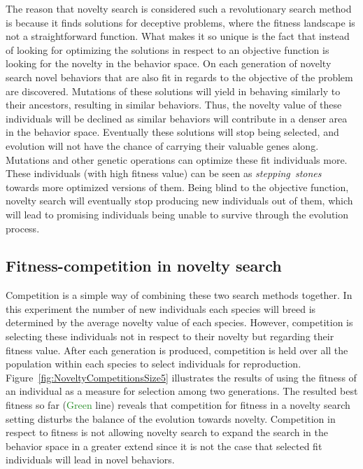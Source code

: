 The reason that novelty search is considered such a revolutionary search method is because it finds solutions for deceptive problems, where the fitness landscape is not a straightforward function. What makes it so unique is the fact that instead of looking for optimizing the solutions in respect to an objective function is looking for the novelty in the behavior space. On each generation of novelty search novel behaviors that are also fit in regards to the objective of the problem are discovered. Mutations of these solutions will yield in behaving similarly to their ancestors, resulting in similar behaviors. Thus, the novelty value of these individuals will be declined as similar behaviors will contribute in a denser area in the behavior space. Eventually these solutions will stop being selected, and evolution will not have the chance of carrying their valuable genes along. Mutations and other genetic operations can optimize these fit individuals more. These individuals (with high fitness value) can be seen as \emph{stepping~stones}~\citep{lehman2011abandoning} towards more optimized versions of them. Being blind to the objective function, novelty search will eventually stop producing new individuals out of them, which will lead to promising individuals being unable to survive through the evolution process.

\subsection*{Fitness-competition in novelty search}


Competition is a simple way of combining these two search methods together. In this experiment the number of new individuals each species will breed is determined by the average novelty value of each species. However, competition is selecting these individuals not in respect to their novelty but regarding their fitness value. After each generation is produced, competition is held over all the population within each species to select individuals for reproduction. Figure~\ref{fig:NoveltyCompetitionsSize5} illustrates the results of using the fitness of an individual as a measure for selection among two generations. The resulted best fitness so far (\textcolor{ForestGreen}{Green} line) reveals that competition for fitness in a novelty search setting disturbs the balance of the evolution towards novelty. Competition in respect to fitness is not allowing novelty search to expand the search in the behavior space in a greater extend since it is not the case that selected fit individuals will lead in novel behaviors. 

